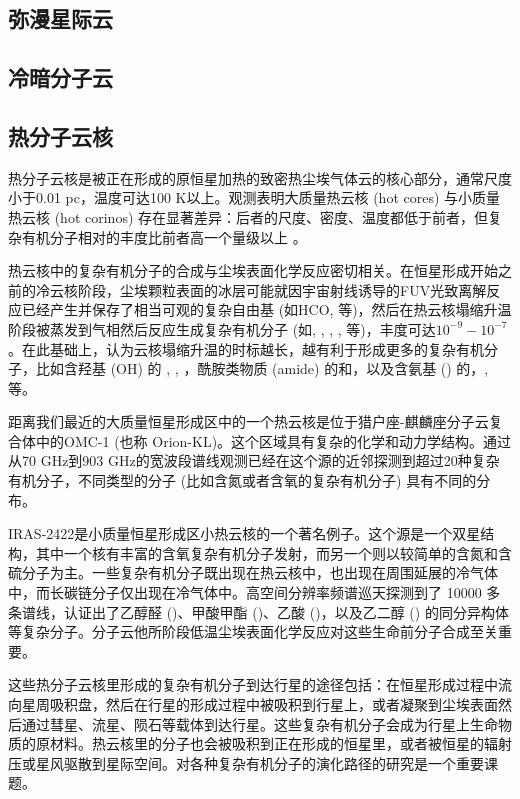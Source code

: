 \documentclass[a4paper]{article}
\newcommand\irassixteen{IRAS\;16293-2422}
\begin{document}
\subsection{弥漫星际云}

\subsection{冷暗分子云}

\subsection{热分子云核}

热分子云核是被正在形成的原恒星加热的致密热尘埃气体云的核心部分，通常尺度小于0.01{} pc，温度可达100 K以上。观测表明大质量热云核 (hot cores) 与小质量热云核 (hot corinos) 存在显著差异：后者的尺度、密度、温度都低于前者，但复杂有机分子相对的丰度比前者高一个量级以上 \citep{Caselli2012}。

热云核中的复杂有机分子的合成与尘埃表面化学反应密切相关。在恒星形成开始之前的冷云核阶段，尘埃颗粒表面的冰层可能就因宇宙射线诱导的FUV光致离解反应已经产生并保存了相当可观的复杂自由基 (如HCO, 等)，然后在热云核塌缩升温阶段被蒸发到气相然后反应生成复杂有机分子 (如, , , , 等)，丰度可达$10^{-9}-10^{-7}$。在此基础上，\citet{Garrod2008}认为云核塌缩升温的时标越长，越有利于形成更多的复杂有机分子，比如含羟基 (OH) 的 , , ，酰胺类物质 (amide) 的和，以及含氨基 () 的，, 等。

距离我们最近的大质量恒星形成区中的一个热云核是位于猎户座-麒麟座分子云复合体中的OMC-1 (也称 Orion-KL)。这个区域具有复杂的化学和动力学结构。通过从70 GHz到903 GHz的宽波段谱线观测已经在这个源的近邻探测到超过20种复杂有机分子，不同类型的分子 (比如含氮或者含氧的复杂有机分子) 具有不同的分布。

\irassixteen 是小质量恒星形成区小热云核的一个著名例子。这个源是一个双星结构，其中一个核有丰富的含氧复杂有机分子发射，而另一个则以较简单的含氮和含硫分子为主。一些复杂有机分子既出现在热云核中，也出现在周围延展的冷气体中，而长碳链分子仅出现在冷气体中。高空间分辨率频谱巡天探测到了 10000 多条谱线，认证出了乙醇醛 ()、甲酸甲酯 ()、乙酸 ()，以及乙二醇 () 的同分异构体等复杂分子。分子云他所阶段低温尘埃表面化学反应对这些生命前分子合成至关重要。

这些热分子云核里形成的复杂有机分子到达行星的途径包括：在恒星形成过程中流向星周吸积盘，然后在行星的形成过程中被吸积到行星上，或者凝聚到尘埃表面然后通过彗星、流星、陨石等载体到达行星。这些复杂有机分子会成为行星上生命物质的原材料。热云核里的分子也会被吸积到正在形成的恒星里，或者被恒星的辐射压或星风驱散到星际空间。对各种复杂有机分子的演化路径的研究是一个重要课题。
\end{document}
